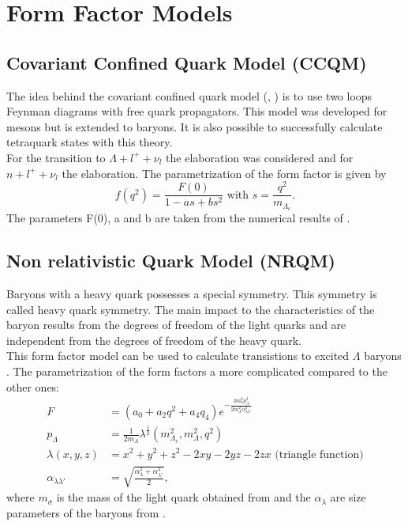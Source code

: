 \section{Form Factor Models}
\subsection{Covariant Confined Quark Model (CCQM)}
The idea behind the covariant confined quark model 
({\cite{CCQM_N}}, {\cite{CCQM_L}}) is to use two loops 
Feynman diagrams with free quark propagators. This model was developed for mesons but 
is extended to baryons. It is also possible to successfully calculate tetraquark 
states with this theory.\\
For the transition to \(\Lambda + l^+ + \nu_l\) the elaboration{\cite{CCQM_L}} was 
considered and for \(n + l^+ + \nu_l\) the elaboration{\cite{CCQM_N}}.
The parametrization of the form factor is given by
\begin{equation}
  f(q^2) = \frac{F(0)}{1 - a s + b s^2} \text{ with } s = \frac{q^2}{m_{\Lambda_c}} \label{eq:ccqmff}.
\end{equation}
The parameters F(0), a and b are taken from the numerical results of {\cite{CCQM_L}}.

\subsection{Non relativistic Quark Model (NRQM)}
Baryons with a heavy quark possesses a special symmetry. This symmetry is 
called heavy quark symmetry. The main impact to the characteristics of the baryon results from the degrees of freedom of the 
light quarks and are independent from the degrees of freedom of the heavy quark. {\cite{NRQM}}\\
This form factor model can be used to calculate transistions to excited \(\Lambda\)
baryons {\cite{NRQM}}. The parametrization of the form factors a more complicated compared 
to the other ones:
\begin{align}
  F &= \left(a_0 + a_2 q^2 + a_4 q_4\right) e^{- \frac{3 m_\sigma^2 p_\Lambda^2}
  {2 m_\Lambda^2 \alpha_{\lambda \lambda'}^2} } \nonumber\\
  p_\Lambda & = \frac{1}{2 m_\Lambda}  \lambda^\frac{1}{2}(m_{\Lambda_c}^2, m_\Lambda^2, q^2) \nonumber \\
  \lambda(x, y, z) & = x^2 + y^2 + z^2 - 2xy - 2yz - 2zx \text{ (triangle function)} \nonumber \\
  \alpha_{\lambda \lambda'} & = \sqrt{\frac{\alpha_\lambda^2 + \alpha_{\lambda'}^2 }{2}}, \label{eq:nrqmff}
\end{align}
where \(m_\sigma\) is the mass of the light quark obtained from 
{\cite[p. 13/I]{NRQM}} and the \(\alpha_\lambda\) are size parameters of 
the baryons from {\cite[p. 13/II]{NRQM}}.

